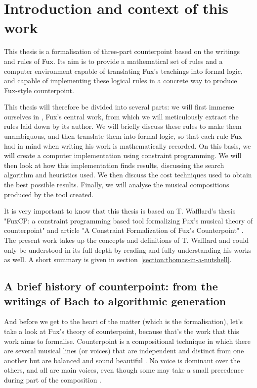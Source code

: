 \chapter{Introduction and context of this work}
This thesis is a formalisation of three-part counterpoint based on the writings and rules of Fux. Its aim is to provide a mathematical set of rules and a computer environment capable of translating Fux's teachings into formal logic, and capable of implementing these logical rules in a concrete way to produce Fux-style counterpoint.


This thesis will therefore be divided into several parts: we will first immerse ourselves in \gap, Fux's central work, from which we will meticulously extract the rules laid down by its author. We will briefly discuss these rules to make them unambiguous, and then translate them into formal logic, so that each rule Fux had in mind when writing his work is mathematically recorded. On this basis, we will create a computer implementation using constraint programming. We will then look at how this implementation finds results, discussing the search algorithm and heuristics used. We then discuss the cost techniques used to obtain the best possible results. Finally, we will analyse the musical compositions produced by the tool created.

It is very important to know that this thesis is based on T. Wafflard's thesis "FuxCP: a constraint programming based tool formalizing Fux's musical theory of counterpoint" \cite{wafflard2023} and article "A Constraint Formalization of Fux's Counterpoint" \cite{sprockeels2023constraint}. The present work takes up the concepts and definitions of T. Wafflard and could only be understood in its full depth by reading and fully understanding his works as well. A short summary is given in section~\ref{section:thomas-in-a-nutshell}.



\section{A brief history of counterpoint: from the writings of Bach to algorithmic generation}
And before we get to the heart of the matter (which is the formalisation), let's take a look at Fux's theory of counterpoint, because that's the work that this work aims to formalise. Counterpoint is a compositional technique in which there are several musical lines (or voices) that are independent and distinct from one another but are balanced and sound beautiful \cite{CpSachs}. No voice is dominant over the others, and all are main voices, even though some may take a small precedence during part of the composition \cite{hess2016}.  


